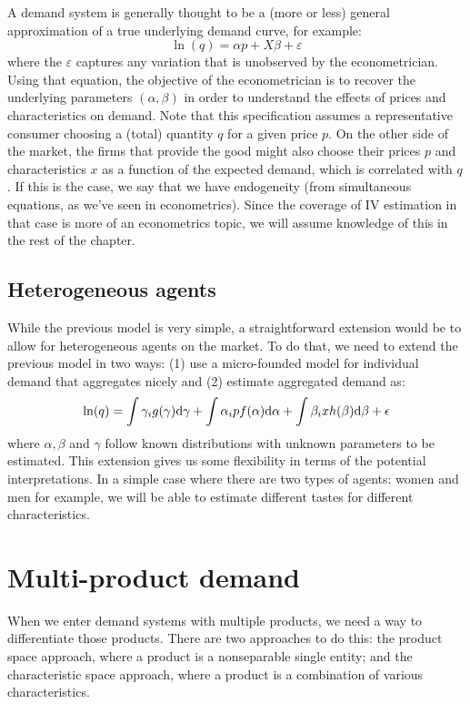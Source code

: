 A demand system is generally thought to be a (more or less) general approximation of a true underlying demand curve, for example: $$\ln(q) = \alpha p + X\beta + \varepsilon $$ where the $\varepsilon$ captures any variation that is unobserved by the econometrician. Using that equation, the objective of the econometrician is to recover the underlying parameters $(\alpha, \beta)$ in order to understand the effects of prices and characteristics on demand. Note that this specification assumes a representative consumer choosing a (total) quantity $q$ for a given price $p$. On the other side of the market, the firms that provide the good might also choose their prices $p$ and characteristics $x$ as a function of the expected demand, which is correlated with $q$. If this is the case, we say that we have endogeneity (from simultaneous equations, as we've seen in econometrics). Since the coverage of IV estimation in that case is more of an econometrics topic, we will assume knowledge of this in the rest of the chapter.

\subsection{Heterogeneous agents}

While the previous model is very simple, a straightforward extension would be to allow for heterogeneous agents on the market. To do that, we need to extend the previous model in two ways: (1) use a micro-founded model for individual demand that aggregates nicely and (2) estimate aggregated demand as: $$ \ln(q) = \int \gamma_i g(\gamma)\mathrm{d}\gamma + \int \alpha_i p f(\alpha)\mathrm{d}\alpha + \int \beta_i x h(\beta)\mathrm{d}\beta + \epsilon $$ where $\alpha, \beta$ and $\gamma$ follow known distributions with unknown parameters to be estimated. This extension gives us some flexibility in terms of the potential interpretations. In a simple case where there are two types of agents: women and men for example, we will be able to estimate different tastes for different characteristics.

\section{Multi-product demand}

When we enter demand systems with multiple products, we need a way to differentiate those products. There are two approaches to do this: the product space approach, where a product is a nonseparable single entity; and the characteristic space approach, where a product is a combination of various characteristics.

